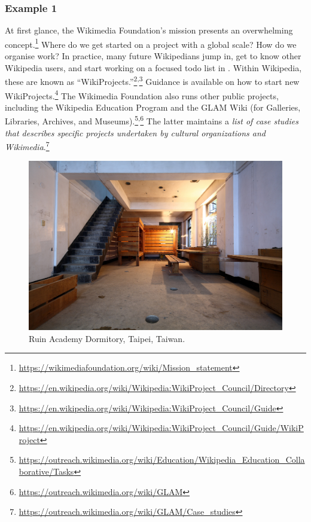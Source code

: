 \subsubsection*{Example 1}
At first glance, the Wikimedia Foundation's mission presents an overwhelming concept.\footnote{\url{https://wikimediafoundation.org/wiki/Mission_statement}} Where do we get started on a project with a global scale? How do we organise work?
In practice, many future Wikipedians jump in, get to know other Wikipedia users, and start working on a focused todo list in
.
Within Wikipedia, these are known as ``WikiProjects.''\footnote{\url{https://en.wikipedia.org/wiki/Wikipedia:WikiProject_Council/Directory}}\textsuperscript{,}\footnote{\url{https://en.wikipedia.org/wiki/Wikipedia:WikiProject_Council/Guide}}
Guidance is available on how to start new WikiProjects.\footnote{\url{https://en.wikipedia.org/wiki/Wikipedia:WikiProject_Council/Guide/WikiProject}}
The Wikimedia Foundation also runs other public projects, including the Wikipedia Education Program and the GLAM Wiki (for Galleries, Libraries, Archives, and Museums).\footnote{\url{https://outreach.wikimedia.org/wiki/Education/Wikipedia_Education_Collaborative/Tasks}}\textsuperscript{,}\footnote{\url{https://outreach.wikimedia.org/wiki/GLAM}}  The latter maintains a \emph{list of case studies that describes specific projects undertaken by cultural organizations and Wikimedia}.\footnote{\url{https://outreach.wikimedia.org/wiki/GLAM/Case_studies}}

\begin{figure}
\vspace{-.7cm}
\begin{center}
\includegraphics[width=.45\textwidth]{Ruin_Academy_Dorm}
\end{center}
\vspace{-.5cm}
\caption{Ruin Academy Dormitory, Taipei, Taiwan. 
\label{dormitory}
}
\vspace{-.3cm}
\end{figure}

